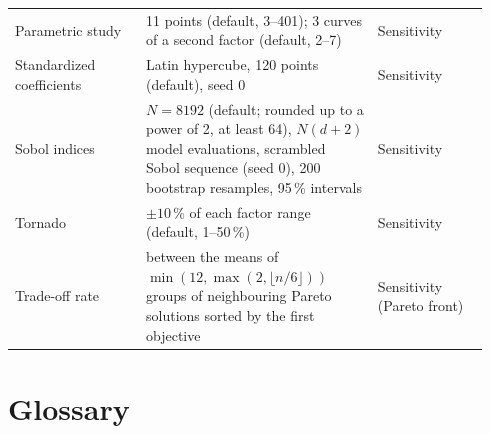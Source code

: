 {\begin{longtable}{@{}p{0.26\linewidth}p{0.46\linewidth}p{0.22\linewidth}@{}}
Parametric study & 11 points (default, 3--401); 3 curves of a second factor (default, 2--7) & Sensitivity \\
Standardized coefficients & Latin hypercube, 120 points (default), seed 0 & Sensitivity \\
Sobol indices & $N = 8192$ (default; rounded up to a power of 2, at least 64), $N(d+2)$ model evaluations,
  scrambled Sobol sequence (seed 0), 200 bootstrap resamples, 95\,\% intervals & Sensitivity \\
Tornado & $\pm 10\,\%$ of each factor range (default, 1--50\,\%) & Sensitivity \\
Trade-off rate & between the means of $\min(12, \max(2, \lfloor n/6 \rfloor))$ groups of neighbouring Pareto
  solutions sorted by the first objective & Sensitivity (Pareto front) \\
\end{longtable}}

\section{Glossary}
\label{sec:a-glossary}

